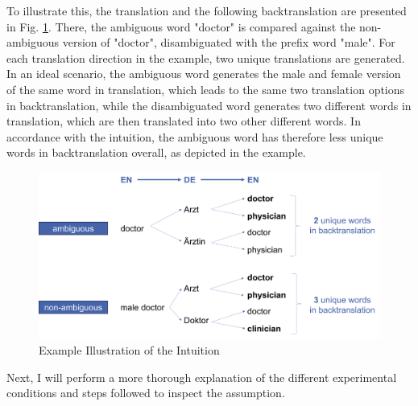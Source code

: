 To illustrate this, the translation and the following backtranslation are presented in Fig. \ref{fig:intuition}. There, the ambiguous word "doctor" is compared against the non-ambiguous version of "doctor", disambiguated with the prefix word "male". For each translation direction in the example, two unique translations are generated. In an ideal scenario, the ambiguous word generates the male and female version of the same word in translation, which leads to the same two translation options in backtranslation, while the disambiguated word generates two different words in translation, which are then translated into two other different words. In accordance with the intuition, the ambiguous word has therefore less unique words in backtranslation overall, as depicted in the example.

\begin{figure}
  \centering
  \includegraphics[scale=0.45]{figures/intuition.png}
  \caption{Example Illustration of the Intuition}
  \label{fig:intuition}
\end{figure}

Next, I will perform a more thorough explanation of the different experimental conditions and steps followed to inspect the assumption.



